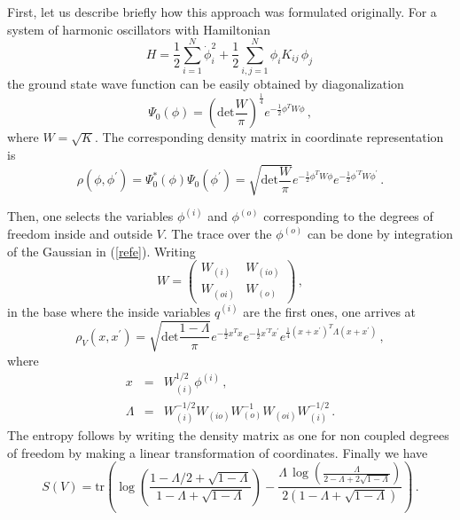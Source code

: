 \documentclass[11pt]{article}
\begin{document}
First, let us describe briefly how this approach was formulated originally.   For a system of harmonic oscillators with  Hamiltonian
\begin{equation}
H=\frac{1}{2}\sum_{i=1}^N \dot{\phi}_i^2 +\frac{1}{2}\sum_{i,j=1}^N \phi_i K_{ij}\, \phi_j\,\label{hache}
\end{equation}
the ground state wave function can be easily obtained by diagonalization
\begin{equation}
\Psi_0(\phi)=\left(\textrm{det}\frac{W}{\pi}\right)^{\frac{1}{4}}e^{-\frac{1}{2}\phi^T W \phi}\,,
\end{equation}
where $W=\sqrt{K}$.
 The corresponding density matrix in coordinate representation is  
\begin{equation}
\rho(\phi,\phi^\prime)=\Psi_0^*(\phi)\Psi_0(\phi^\prime)=\sqrt{\textrm{det}\frac{W}{\pi}}e^{-\frac{1}{2}\phi^T W \phi} e^{-\frac{1}{2}\phi^{\prime T} W \phi^\prime}\,.\label{refe}
\end{equation}

Then, one selects the variables $\phi^{(i)}$ and $\phi^{(o)}$ corresponding to the degrees of freedom inside and outside $V$. The trace over the $\phi^{(o)}$ can be done by integration of the Gaussian  in (\ref{refe}). Writing
\begin{equation}
W=\left(
\begin{array}{cc}
W_{(i)} & W_{(io)} \\
W_{(oi)} & W_{(o)}
\end{array} 
\right)\,,
\end{equation}   
in the base where the inside variables $q^{(i)}$ are the first ones, one arrives at
\begin{equation}
\rho_V(x,x^\prime)=\sqrt{\textrm{det}\frac{1-\Lambda}{\pi}}e^{-\frac{1}{2}x^T x} e^{-\frac{1}{2}x^{\prime T} x^\prime} e^{\frac{1}{4} (x+x^\prime)^T \Lambda (x+x^\prime)}\,,
\end{equation}
where  
\begin{eqnarray}
x &=&W_{(i)}^{1/2} \phi^{(i)}\,,\\
\Lambda &=& W_{(i)}^{-1/2} W_{(io)} W_{(o)}^{-1} W_{(oi)}  W_{(i)}^{-1/2}   \,.\label{baba}
\end{eqnarray}
The entropy follows by writing the density matrix as one for non coupled degrees of freedom by making a linear transformation of coordinates. Finally we have
\begin{equation}
S(V)=\textrm{tr} \left(\log (\frac{1-\Lambda/2+\sqrt{1-\Lambda}}{1-\Lambda+\sqrt{1-\Lambda}})-\frac{\Lambda\, \log \left(\frac{\Lambda}{2-\Lambda+2\sqrt{1-\Lambda}}\right)}{2 (1-\Lambda+\sqrt{1-\Lambda})}\right)\,.\label{la}
\end{equation}
\end{document}

